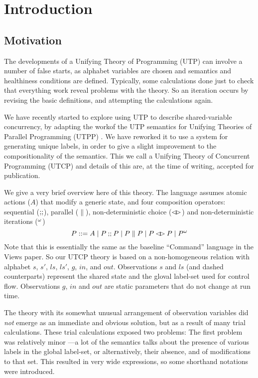 \section{Introduction}\label{sec:Intro}

\subsection{Motivation}

The developments of a Unifying Theory of Programming (UTP)
can involve a number of false starts,
as alphabet variables are chosen
and semantics and healthiness conditions are defined.
Typically, some calculations done just to check that everything
work reveal problems with the theory.
So an iteration occurs by revising the basic definitions,
and attempting the calculations again.

We have recently started to explore using UTP
to describe shared-variable concurrency,
by adapting the workof the  UTP semantics for Unifying Theories
of Parallel Programming (UTPP) \cite{DBLP:conf/icfem/WoodcockH02}.
We have reworked it to use a system for generating unique labels,
in order to give a slight improvement to the compositionality
of the semantics. This we call a Unifying Theory of Concurrent Programming
(UTCP) and details of this are,
at the time of writing,
accepted for publication\cite{conf/tase/BMN16}.

We give a very brief overview here of this theory.
The language assumes atomic actions ($A$) that modify a generic state,
and four composition operators: sequential ($\mathrel{\mathbf{;\!;}}$), parallel ($\parallel$),
non-deterministic choice ($\mathbin{\lhd\!\rhd}$) and non-deterministic iterations (${}^{\omega}$)
\[
   P ::= A \mid P \mathbin{\mathbf{;\!;}} P \mid P \parallel P \mid P \mathbin{\lhd\!\rhd} P \mid {P}^{\omega}
\]
Note that this is essentially the same as the baseline ``Command'' language
in the Views paper\cite{conf/popl/Dinsdale-YoungBGPY13}.
So our UTCP theory is based on a non-homogeneous relation
with alphabet $s$, $s'$, $ls$, $ls'$, $g$, $in$, and $out$.
Observations $s$ and $ls$ (and dashed counterparts)
represent the shared state and the gloval label-set used for control flow.
Observations $g$, $in$ and $out$ are static parameters that do not change
at run time.


The theory with its somewhat unusual arrangement of observation variables
did \emph{not} emerge as an immediate and obvious solution,
but as a result of many trial calculations.
These trial calculations exposed two problems:
The first problem was relatively minor
---a lot of the semantics talks about the presence of various
labels in the global label-set, or alternatively, their  absence,
and of modifications to that set.
This resulted in very wide expressions,
so some shorthand notations were introduced.

